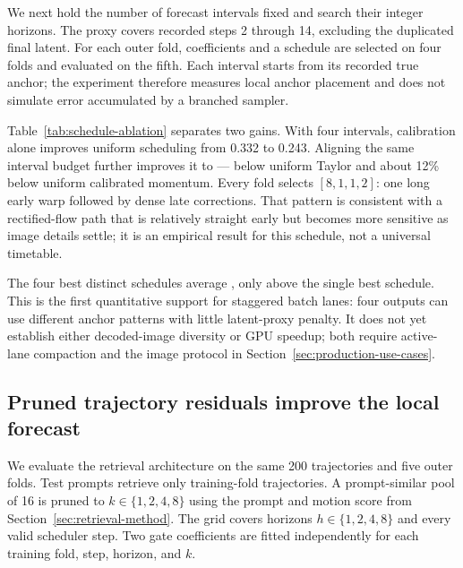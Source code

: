 \documentclass[11pt,a4paper]{article}
\newcommand{\relltwo}{\ensuremath{\mathrm{relL2}}}
\begin{document}
We next hold the number of forecast intervals fixed and search their integer
horizons. The proxy covers recorded steps 2 through 14, excluding the duplicated
final latent. For each outer fold, coefficients and a schedule are selected on
four folds and evaluated on the fifth. Each interval starts from its recorded
true anchor; the experiment therefore measures local anchor placement and does
not simulate error accumulated by a branched sampler.

\begin{table}[ht]
\centering
\scriptsize

\caption{Five-fold anchor-schedule ablation. The budget counts forecast
intervals, not denoiser calls. Entries are mean local
\relltwo{} $\pm$ standard deviation. Four staggered reports the mean of the four
best distinct training-fold schedules, modelling four batch lanes. Selected
horizons are stable across all five folds. Lower is better.}
\label{tab:schedule-ablation}
\end{table}

Table~\ref{tab:schedule-ablation} separates two gains. With four intervals,
calibration alone improves uniform scheduling from 0.332 to 0.243. Aligning the
same interval budget further improves it to
\AlignedFourRelLTwo{}---\AlignedFourImprovement{} below uniform Taylor and
about 12\% below uniform calibrated momentum. Every fold selects
$[8,1,1,2]$: one long early warp followed by dense late corrections. That
pattern is consistent with a rectified-flow path that is relatively straight
early but becomes more sensitive as image details settle; it is an empirical
result for this schedule, not a universal timetable.

The four best distinct schedules average \StaggeredFourRelLTwo{}, only
\StaggeredGap{} above the single best schedule. This is the first quantitative
support for staggered batch lanes: four outputs can use different anchor
patterns with little latent-proxy penalty. It does not yet establish either
decoded-image diversity or GPU speedup; both require active-lane compaction and
the image protocol in Section~\ref{sec:production-use-cases}.

\subsection{Pruned trajectory residuals improve the local forecast}
\label{sec:knn-ablation}

We evaluate the retrieval architecture on the same 200 trajectories and five
outer folds. Test prompts retrieve only training-fold trajectories. A
prompt-similar pool of 16 is pruned to $k\in\{1,2,4,8\}$ using the prompt and
motion score from Section~\ref{sec:retrieval-method}. The grid covers horizons
$h\in\{1,2,4,8\}$ and every valid scheduler step. Two gate coefficients are
fitted independently for each training fold, step, horizon, and $k$.
\end{document}
